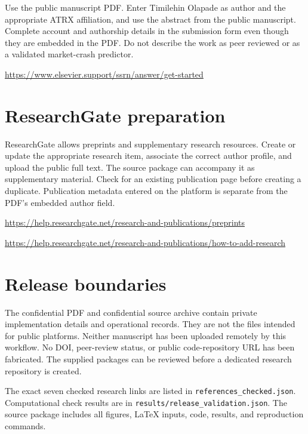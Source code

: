 \documentclass[11pt,a4paper]{article}
\begin{document}
Use the public manuscript PDF. Enter Timilehin Olapade as author and the appropriate ATRX affiliation, and use the abstract from the public manuscript. Complete account and authorship details in the submission form even though they are embedded in the PDF. Do not describe the work as peer reviewed or as a validated market-crash predictor.
\par\url{https://www.elsevier.support/ssrn/answer/get-started}

\section*{ResearchGate preparation}
ResearchGate allows preprints and supplementary research resources. Create or update the appropriate research item, associate the correct author profile, and upload the public full text. The source package can accompany it as supplementary material. Check for an existing publication page before creating a duplicate. Publication metadata entered on the platform is separate from the PDF's embedded author field.
\par\url{https://help.researchgate.net/research-and-publications/preprints}
\par\url{https://help.researchgate.net/research-and-publications/how-to-add-research}

\section*{Release boundaries}
The confidential PDF and confidential source archive contain private implementation details and operational records. They are not the files intended for public platforms. Neither manuscript has been uploaded remotely by this workflow. No DOI, peer-review status, or public code-repository URL has been fabricated. The supplied packages can be reviewed before a dedicated research repository is created.

The exact seven checked research links are listed in \texttt{references\_checked.json}. Computational check results are in \texttt{results/release\_validation.json}. The source package includes all figures, LaTeX inputs, code, results, and reproduction commands.
\end{document}
